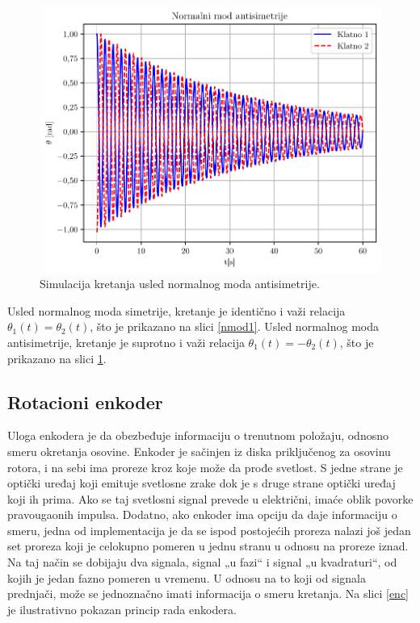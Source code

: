 \documentclass[a4paper, 12pt, diplomski]{etf}
\newcommand{\navod}[1]{„#1“}
\begin{document}
\begin{figure}[h!]
    \centering
    \includegraphics[scale=0.9]{py_teorija/nmod_asimetrija.pdf}
    \caption{Simulacija kretanja usled normalnog moda antisimetrije.}
    \label{nmod2}
\end{figure}


\noindent
Usled normalnog moda simetrije, kretanje je identično i važi relacija $\theta_1(t) = \theta_2(t)$, što je prikazano na slici \ref{nmod1}. Usled normalnog moda antisimetrije, kretanje je suprotno i važi relacija $\theta_1(t) = -\theta_2(t)$, što je prikazano na slici \ref{nmod2}. 
\cite{mit}
\cite{dos}



\subsection{Rotacioni enkoder}
Uloga enkodera je da obezbeđuje informaciju o trenutnom položaju, odnosno smeru okretanja osovine. Enkoder je sačinjen iz diska priključenog za osovinu rotora, i na sebi ima proreze kroz koje može da prođe svetlost. S jedne strane je optički uređaj koji emituje svetlosne zrake dok je s druge strane optički uređaj koji ih prima. Ako se taj svetlosni signal prevede u električni, imaće oblik povorke pravougaonih impulsa. Dodatno, ako enkoder ima opciju da daje informaciju o smeru, jedna od implementacija je da se ispod postojećih proreza nalazi još jedan set proreza koji je celokupno pomeren u jednu stranu u odnosu na proreze iznad. 
Na taj način se dobijaju dva signala, signal \navod{u fazi} i signal \navod{u kvadraturi}, od kojih je jedan fazno pomeren u vremenu. U odnosu na to koji od signala prednjači, može se jednoznačno imati informacija o smeru kretanja. Na slici \ref{enc} je ilustrativno pokazan princip rada enkodera.
\end{document}
